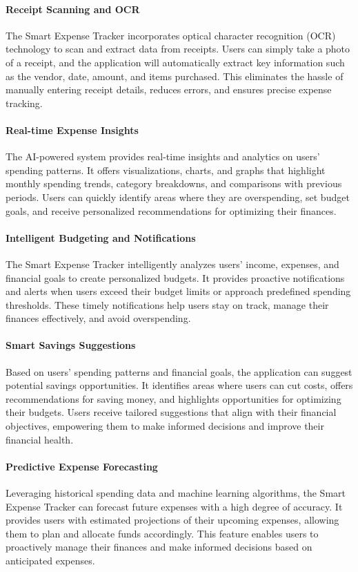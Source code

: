 \paragraph{Receipt Scanning and OCR}
The Smart Expense Tracker incorporates optical character recognition (OCR) technology to scan and extract data 
from receipts. Users can simply take a photo of a receipt, and the application will automatically extract key 
information such as the vendor, date, amount, and items purchased. This eliminates the hassle of manually entering 
receipt details, reduces errors, and ensures precise expense tracking.

\paragraph{Real-time Expense Insights}
The AI-powered system provides real-time insights and analytics on users' spending patterns. It offers visualizations, 
charts, and graphs that highlight monthly spending trends, category breakdowns, and comparisons with previous periods. 
Users can quickly identify areas where they are overspending, set budget goals, and receive personalized 
recommendations for optimizing their finances.

\paragraph{Intelligent Budgeting and Notifications}
The Smart Expense Tracker intelligently analyzes users' income, expenses, and financial goals to create personalized 
budgets. It provides proactive notifications and alerts when users exceed their budget limits or approach predefined 
spending thresholds. These timely notifications help users stay on track, manage their finances effectively, and 
avoid overspending.

\paragraph{Smart Savings Suggestions}
Based on users' spending patterns and financial goals, the application can suggest potential savings opportunities. 
It identifies areas where users can cut costs, offers recommendations for saving money, and highlights opportunities 
for optimizing their budgets. Users receive tailored suggestions that align with their financial objectives, 
empowering them to make informed decisions and improve their financial health.

\paragraph{Predictive Expense Forecasting}
Leveraging historical spending data and machine learning algorithms, the Smart Expense Tracker can forecast future 
expenses with a high degree of accuracy. It provides users with estimated projections of their upcoming expenses, 
allowing them to plan and allocate funds accordingly. This feature enables users to proactively manage their 
finances and make informed decisions based on anticipated expenses.

